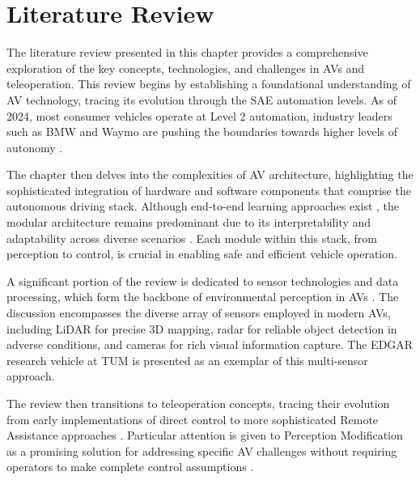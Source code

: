 
\chapter{Literature Review}\label{chapter:literaturereview}
The literature review presented in this chapter provides a comprehensive exploration of the key concepts,
technologies, and challenges in \acp{AV} and teleoperation. This review begins by establishing a
foundational understanding of \ac{AV} technology, tracing its evolution through the SAE automation levels.
As of 2024, most consumer vehicles operate at Level 2 automation, industry leaders such as BMW and Waymo
are pushing the boundaries towards higher levels of autonomy \cite{bmw2024} \cite{evmagazine2024}.

The chapter then delves into the complexities of \ac{AV} architecture, highlighting the sophisticated
integration of hardware and software components that comprise the autonomous driving stack. Although end-to-end learning
approaches exist \cite{e2e}, the modular architecture remains predominant due to its interpretability and adaptability
across diverse scenarios \cite{codevilla2019limitations}. Each module within this stack, from perception to control,
is crucial in enabling safe and efficient vehicle operation.

A significant portion of the review is dedicated to sensor technologies and data processing, which form the backbone of
environmental perception in \acp{AV} \cite{feng2020deep,el-sheimy2020sensorfusion}. The discussion encompasses
the diverse array of sensors employed in modern \acp{AV}, including \ac{LiDAR} for precise 3D mapping, radar for reliable object
detection in adverse conditions, and cameras for rich visual information capture. The EDGAR research vehicle at TUM is presented
as an exemplar of this multi-sensor approach.

The review then transitions to teleoperation concepts, tracing their evolution from early implementations of direct control to more sophisticated
Remote Assistance approaches \cite{kay2024sharedcontrol,corridor,hosseini2024collaborative,Feiler2021ThePM}. Particular attention is
given to Perception Modification as a promising solution for addressing specific \ac{AV} challenges without requiring operators
to make complete control assumptions \cite{Feiler2021ThePM,Brecht}.

